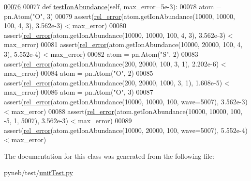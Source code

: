 \begin{DoxyCode}
\hypertarget{classpyneb_1_1test_1_1unit_test_1_1_unit_test_l00076}{}\hyperlink{classpyneb_1_1test_1_1unit_test_1_1_unit_test_a7a316a645d962527433b1e5b4de4f5ce}{00076} 
00077         \textcolor{keyword}{def }\hyperlink{classpyneb_1_1test_1_1unit_test_1_1_unit_test_a7a316a645d962527433b1e5b4de4f5ce}{testIonAbundance}(self, max\_error=5e-3):
00078                 atom = pn.Atom(\textcolor{stringliteral}{"O"}, 3)
00079                 assert(\hyperlink{namespacepyneb_1_1test_1_1unit_test_a3c7e23eb1c34daaa75eec988c96dc7b9}{rel\_error}(atom.getIonAbundance(10000, 10000, 100, 4, 3), 3.562e-3) < 
      max\_error)
00080                 assert(\hyperlink{namespacepyneb_1_1test_1_1unit_test_a3c7e23eb1c34daaa75eec988c96dc7b9}{rel\_error}(atom.getIonAbundance(10000, 10000, 100, 4, 3), 3.562e-3) < 
      max\_error)
00081                 assert(\hyperlink{namespacepyneb_1_1test_1_1unit_test_a3c7e23eb1c34daaa75eec988c96dc7b9}{rel\_error}(atom.getIonAbundance(10000, 20000, 100, 4, 3), 5.552e-4) < 
      max\_error)
00082                 atom = pn.Atom(\textcolor{stringliteral}{"S"}, 2)
00083                 assert(\hyperlink{namespacepyneb_1_1test_1_1unit_test_a3c7e23eb1c34daaa75eec988c96dc7b9}{rel\_error}(atom.getIonAbundance(200, 20000, 100, 3, 1), 2.202e-6) < 
      max\_error)
00084                 atom = pn.Atom(\textcolor{stringliteral}{"O"}, 2)
00085                 assert(\hyperlink{namespacepyneb_1_1test_1_1unit_test_a3c7e23eb1c34daaa75eec988c96dc7b9}{rel\_error}(atom.getIonAbundance(200, 20000, 1000, 3, 1), 1.608e-5) < 
      max\_error)
00086                 atom = pn.Atom(\textcolor{stringliteral}{"O"}, 3)
00087                 assert(\hyperlink{namespacepyneb_1_1test_1_1unit_test_a3c7e23eb1c34daaa75eec988c96dc7b9}{rel\_error}(atom.getIonAbundance(10000, 10000, 100, wave=5007), 3.562e-3) < 
      max\_error)
00088                 assert(\hyperlink{namespacepyneb_1_1test_1_1unit_test_a3c7e23eb1c34daaa75eec988c96dc7b9}{rel\_error}(atom.getIonAbundance(10000, 10000, 100, -5, 1, 5007), 3.562e-3) <
       max\_error)
00089                 assert(\hyperlink{namespacepyneb_1_1test_1_1unit_test_a3c7e23eb1c34daaa75eec988c96dc7b9}{rel\_error}(atom.getIonAbundance(10000, 20000, 100, wave=5007), 5.552e-4) < 
      max\_error)

\end{DoxyCode}


The documentation for this class was generated from the following file\-:\begin{DoxyCompactItemize}
\item 
pyneb/test/\hyperlink{unit_test_8py}{unit\-Test.\-py}\end{DoxyCompactItemize}
